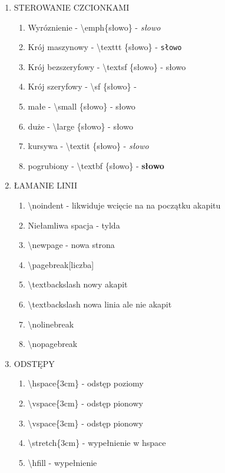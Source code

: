 \documentclass[a4paper,twoside,onecolumn]{report}
\begin{document}
\begin{enumerate}
			\item STEROWANIE CZCIONKAMI
			\begin{enumerate}[*]
				\item Wyróznienie - \textbackslash emph\{słowo\} - \emph{słowo}
				\item Krój maszynowy - \textbackslash texttt \{słowo\} - \texttt{słowo}
				\item Krój bezszeryfowy - \textbackslash textsf \{słowo\} - \textsf{słowo}
				\item Krój szeryfowy - \textbackslash sf \{słowo\} - 
				\item małe - \textbackslash small \{słowo\} - \small{słowo}
				\item duże - \textbackslash large \{słowo\} - \large{słowo}
				\item kursywa - \textbackslash textit \{słowo\} - \textit{słowo}
				\item pogrubiony - \textbackslash textbf \{słowo\} - \textbf{słowo}
			\end{enumerate}

			\item ŁAMANIE LINII
			\begin{enumerate}[*]
				\item \textbackslash noindent - likwiduje wcięcie na na początku akapitu
				\item Niełamliwa spacja - tylda
				\item \textbackslash newpage - nowa strona
				\item \textbackslash pagebreak[liczba]
				\item \textbackslash textbackslash nowy akapit
				\item \textbackslash textbackslash \* nowa linia ale nie akapit
				\item \textbackslash nolinebreak
				\item \textbackslash nopagebreak
			\end{enumerate}

			\item ODSTĘPY
			\begin{enumerate}[*]
				\item \textbackslash hspace\{3cm\} - odstęp poziomy
				\item \textbackslash vspace\{3cm\} - odstęp pionowy
				\item \textbackslash vspace\{3cm\} - odstęp pionowy
				\item \textbackslash stretch\{3cm\} - wypełnienie w hspace
				\item \textbackslash hfill - wypełnienie
			\end{enumerate}


\end{enumerate}
\end{document}
